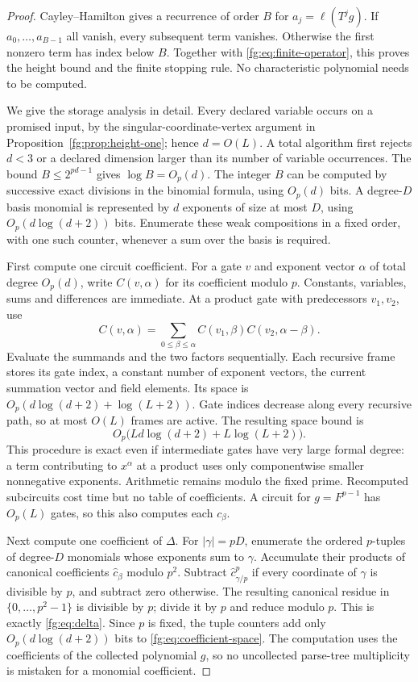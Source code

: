 \begin{proof}
Cayley--Hamilton gives a recurrence of order $B$ for
$a_j=\ell(T^jg)$. If $a_0,\ldots,a_{B-1}$ all vanish, every subsequent
term vanishes. Otherwise the first nonzero term has index below $B$.
Together with \eqref{fg:eq:finite-operator}, this proves the height
bound and the finite stopping rule. No characteristic polynomial needs
to be computed.

We give the storage analysis in detail. Every declared variable occurs
on a promised input, by the singular-coordinate-vertex argument in
Proposition~\ref{fg:prop:height-one}; hence $d=O(L)$. A total algorithm
first rejects $d<3$ or a declared dimension larger than its number of
variable occurrences. The bound $B\le2^{pd-1}$ gives $\log B=O_p(d)$. The integer
$B$ can be computed by successive exact divisions in the binomial
formula, using $O_p(d)$ bits. A degree-$D$ basis monomial is represented
by $d$ exponents of size at most $D$, using $O_p(d\log(d+2))$ bits.
Enumerate these weak compositions in a fixed order, with one such
counter, whenever a sum over the basis is required.

First compute one circuit coefficient. For a gate $v$ and exponent
vector $\alpha$ of total degree $O_p(d)$, write $C(v,\alpha)$ for its
coefficient modulo $p$. Constants, variables, sums and differences are
immediate. At a product gate with predecessors $v_1,v_2$, use
\[
 C(v,\alpha)=\sum_{0\le\beta\le\alpha}
           C(v_1,\beta)C(v_2,\alpha-\beta).
\]
Evaluate the summands and the two factors sequentially. Each recursive
frame stores its gate index, a constant number of exponent vectors,
the current summation vector and field elements. Its space is
$O_p(d\log(d+2)+\log(L+2))$. Gate indices decrease along every recursive
path, so at most $O(L)$ frames are active. The resulting space bound is
\begin{equation}\label{fg:eq:coefficient-space}
 O_p\bigl(Ld\log(d+2)+L\log(L+2)\bigr).
\end{equation}
This procedure is exact even if intermediate gates have very large
formal degree: a term contributing to $x^\alpha$ at a product uses
only componentwise smaller nonnegative exponents. Arithmetic remains
modulo the fixed prime. Recomputed subcircuits cost time but no table
of coefficients. A circuit for $g=F^{p-1}$ has $O_p(L)$ gates, so this
also computes each $c_\beta$.

Next compute one coefficient of $\Delta$. For $|\gamma|=pD$, enumerate
the ordered $p$-tuples of degree-$D$ monomials whose exponents sum to
$\gamma$. Accumulate their products of canonical coefficients
$\widehat c_\beta$ modulo $p^2$. Subtract
$\widehat c_{\gamma/p}^{p}$ if every coordinate of $\gamma$ is divisible
by $p$, and subtract zero otherwise. The resulting canonical residue
in $\{0,\ldots,p^2-1\}$ is divisible by $p$; divide it by $p$ and reduce
modulo $p$. This is exactly \eqref{fg:eq:delta}. Since $p$ is fixed,
the tuple counters add only $O_p(d\log(d+2))$ bits to
\eqref{fg:eq:coefficient-space}. The computation uses the coefficients
of the collected polynomial $g$, so no uncollected parse-tree
multiplicity is mistaken for a monomial coefficient.


\end{proof}
